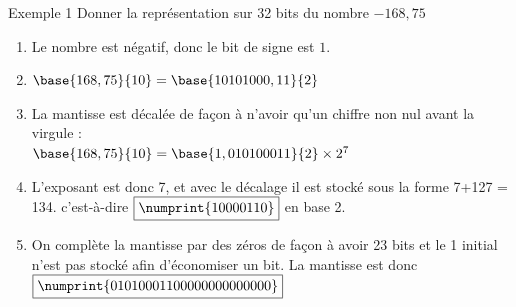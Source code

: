 \documentclass[10pt]{beamer}
\begin{document}
\begin{frame}{\Ctitle}{\stitle}
    \begin{exampleblock}{Exemple 1}
        Donner la représentation sur 32 bits du nombre $-168,75$
        \begin{enumerate}
            \item<2-> Le nombre est négatif, donc le bit de signe est \textcolor{BrickRed}{$\boxed{1}$}.
            \item<3-> $\base{168,75}{10} = \base{10101000,11}{2}$
            \item<4-> La mantisse est décalée de façon à n'avoir qu'un chiffre non nul avant la virgule : \\
            $\base{168,75}{10} = \base{1,010100011}{2} \times 2^{7}$
            \item<5-> L'exposant est donc 7, et avec le décalage il est stocké sous la forme 7+127 = 134. c'est-à-dire \textcolor{blue}{$\boxed{\numprint{10000110}}$} en base 2. 
            \item<6-> On complète la mantisse par des zéros de façon à avoir 23 bits et le 1 initial  n'est pas stocké afin d'économiser un bit. La mantisse est donc \textcolor{OliveGreen}{$\boxed{\numprint{01010001100000000000000}}$}
        \end{enumerate}
    \end{exampleblock}
\end{frame}
\end{document}
